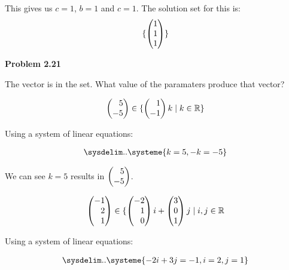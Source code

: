 \documentclass[12pt]{article}
\newenvironment{problem}[1][default]{
  \begin{framed}\begin{minipage}{0.97\textwidth}
  \setlength{\parskip}{4mm}
  {\bf Problem #1}
}{\end{minipage}\end{framed}}
\newenvironment{abc}{\begin{enumerate}[label={\bf(\alph*)}]}{\end{enumerate}}
\newcommand\m[2][]{
	\ifthenelse{\equal {#1} {}}
		{\begin{pmatrix*}[r]#2\end{pmatrix*}}
		{\left(\begin{array}{#1}#2\end{array}\right)}
}
\newcommand\resetequation[1][1]{\setcounter{equation}{#1 - 1}}
\begin{document}
\begin{abc}
\begin{item}
	This gives us $c = 1$, $b = 1$ and $c = 1$. The solution set for this is:
	\begin{equation}
		\{ \m{1 \\ 1 \\ 1} \}
	\end{equation}
	\end{item}
\end{abc}

\begin{problem}[2.21]
	The vector is in the set. What value of the paramaters produce that vector?
\end{problem}

\begin{abc}
	\begin{item}
	\resetequation

	\begin{equation}
	\begin{aligned}
		\m{5 \\ - 5} \in \{ \m{1 \\ -1}k \mid k \in \mathbb{R} \}
	\end{aligned}
	\end{equation}
	
	Using a system of linear equations:

	\begin{equation}
	\begin{aligned}
		\sysdelim..\systeme{k = 5, -k = -5}
	\end{aligned}
	\end{equation}

	We can see $k = 5$ results in $\m{5 \\ - 5}$.
	\end{item}

	\begin{item}
	\resetequation

	\begin{equation}
	\begin{aligned}
		\m{-1 \\ 2 \\ 1} \in \{ \m{-2 \\ 1 \\ 0} i + \m{3 \\ 0 \\ 1}j \mid i, j \in \mathbb{R}
	\end{aligned}
	\end{equation}
	
	Using a system of linear equations:

	\begin{equation}
	\begin{aligned}
		\sysdelim..\systeme{-2i + 3j = -1, i = 2, j = 1}
	\end{aligned}
	\end{equation}
	

\end{item}
\end{abc}
\end{document}
